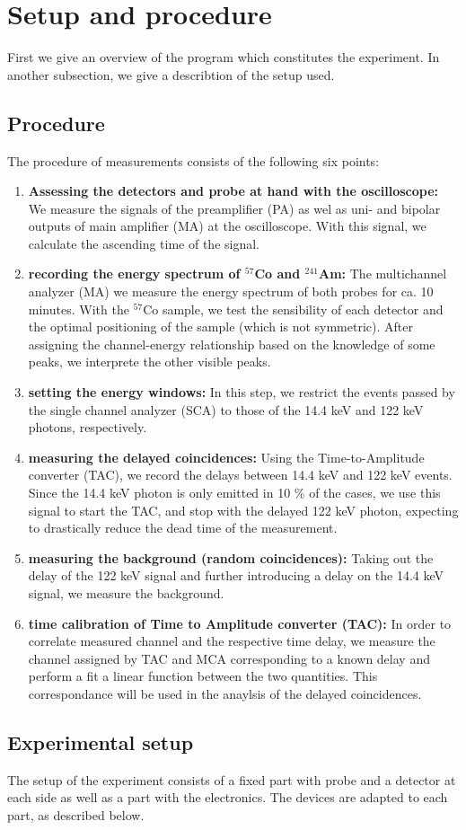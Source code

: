 \section{Setup and procedure}
First we give an overview of the program which constitutes the experiment. In another subsection, 
we give a describtion of the setup used. 
\subsection{Procedure}
The procedure of measurements consists of the following six points:
\begin{enumerate}
    \item 
        \textbf{Assessing the detectors and probe at hand with the oscilloscope:}
        We measure the signals of the preamplifier (PA) as wel as uni- and bipolar outputs of 
        main amplifier (MA) at the oscilloscope. With this signal, we calculate the ascending time 
        of the signal.
    \item 
        \textbf{recording the energy spectrum of $^{57}$Co and $^{241}$Am:}
        The multichannel analyzer (MA) we measure the energy spectrum of both probes 
        for ca. 10 minutes. With the $^{57}$Co sample, we test the sensibility of each detector
        and the optimal positioning of the sample (which is not symmetric). After assigning the 
        channel-energy relationship based on the knowledge of some peaks, we interprete the other visible peaks.
    \item
        \textbf{setting the energy windows:}
        In this step, we restrict the events passed by the single channel analyzer (SCA) to those 
        of the 14.4 keV and 122 keV photons, respectively.
    \item
        \textbf{measuring the delayed coincidences:}
        Using the Time-to-Amplitude converter (TAC), we record the delays between 14.4 keV and 122 keV 
        events. Since the 14.4 keV photon is only emitted in 10 \% of the cases, we use this signal to start the 
        TAC, and stop with the delayed 122 keV photon, expecting to drastically reduce the dead time of the 
        measurement.
    \item
        \textbf{measuring the background (random coincidences):}
        Taking out the delay of the 122 keV signal and further introducing a delay on the 14.4 keV signal, 
        we measure the background. 
    \item
        \textbf{time calibration of Time to Amplitude converter (TAC):}
        In order to correlate measured channel and the respective time delay, we measure the channel 
        assigned by TAC and MCA corresponding to a known delay and perform a fit a linear function between 
        the two quantities. This correspondance will be used in the anaylsis of the delayed coincidences. 
\end{enumerate}


\subsection{Experimental setup}
The setup of the experiment consists of a fixed part with probe and a detector at each side 
as well as a part with the electronics. The devices are adapted to each part, as described below. 




